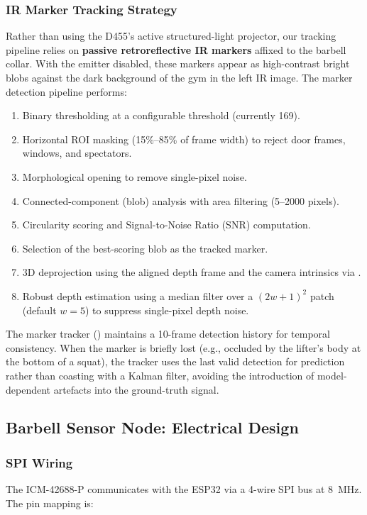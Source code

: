 \subsubsection{IR Marker Tracking Strategy}
Rather than using the D455's active structured-light projector, our tracking pipeline relies on \textbf{passive retroreflective IR markers} affixed to the barbell collar.
With the emitter disabled, these markers appear as high-contrast bright blobs against the dark background of the gym in the left IR image.
The marker detection pipeline performs:
\begin{enumerate}[nosep]
  \item Binary thresholding at a configurable threshold (currently 169).
  \item Horizontal ROI masking (15\%--85\% of frame width) to reject door frames, windows, and spectators.
  \item Morphological opening to remove single-pixel noise.
  \item Connected-component (blob) analysis with area filtering (5--2000 pixels).
  \item Circularity scoring and Signal-to-Noise Ratio (SNR) computation.
  \item Selection of the best-scoring blob as the tracked marker.
  \item 3D deprojection using the aligned depth frame and the camera intrinsics via .
  \item Robust depth estimation using a median filter over a $(2w+1)^2$ patch (default $w=5$) to suppress single-pixel depth noise.
\end{enumerate}

The marker tracker () maintains a 10-frame detection history for temporal consistency.
When the marker is briefly lost (e.g., occluded by the lifter's body at the bottom of a squat), the tracker uses the last valid detection for prediction rather than coasting with a Kalman filter, avoiding the introduction of model-dependent artefacts into the ground-truth signal.


\subsection{Barbell Sensor Node: Electrical Design}

\subsubsection{SPI Wiring}
The ICM-42688-P communicates with the ESP32 via a 4-wire SPI bus at \SI{8}{\mega\hertz}.
The pin mapping is:

